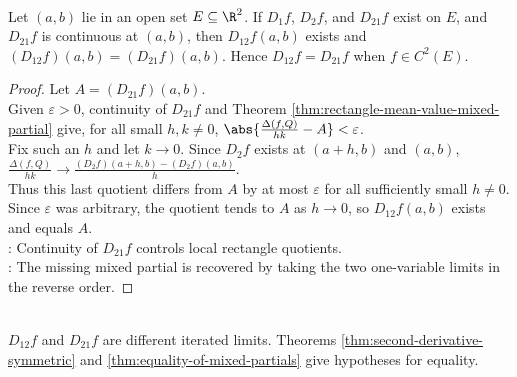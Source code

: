 \begin{theorem} \label{thm:equality-of-mixed-partials} \\
Let $(a,b)$ lie in an open set $E\subseteq\R^2$. If $D_1f$, $D_2f$, and $D_{21}f$ exist on $E$, and $D_{21}f$ is continuous at $(a,b)$, then $D_{12}f(a,b)$ exists and $(D_{12}f)(a,b)=(D_{21}f)(a,b)$. Hence $D_{12}f=D_{21}f$ when $f\in C^2(E)$.
\begin{proof}
Let $A=(D_{21}f)(a,b)$.\\
Given $\varepsilon>0$, continuity of $D_{21}f$ and Theorem \ref{thm:rectangle-mean-value-mixed-partial} give, for all small $h,k\neq0$, $\abs{\frac{\Delta(f,Q)}{hk}-A}<\varepsilon$.\\
Fix such an $h$ and let $k\to0$. Since $D_2f$ exists at $(a+h,b)$ and $(a,b)$, $\frac{\Delta(f,Q)}{hk}\to \frac{(D_2f)(a+h,b)-(D_2f)(a,b)}{h}$.\\
Thus this last quotient differs from $A$ by at most $\varepsilon$ for all sufficiently small $h\neq0$.\\
Since $\varepsilon$ was arbitrary, the quotient tends to $A$ as $h\to0$, so $D_{12}f(a,b)$ exists and equals $A$.\\
: Continuity of $D_{21}f$ controls local rectangle quotients.\\
: The missing mixed partial is recovered by taking the two one-variable limits in the reverse order.
\end{proof}
\end{theorem}

\begin{perspective} \label{per:mixed-partials-need-hypotheses} \\
$D_{12}f$ and $D_{21}f$ are different iterated limits. Theorems \ref{thm:second-derivative-symmetric} and \ref{thm:equality-of-mixed-partials} give hypotheses for equality.
\end{perspective}

